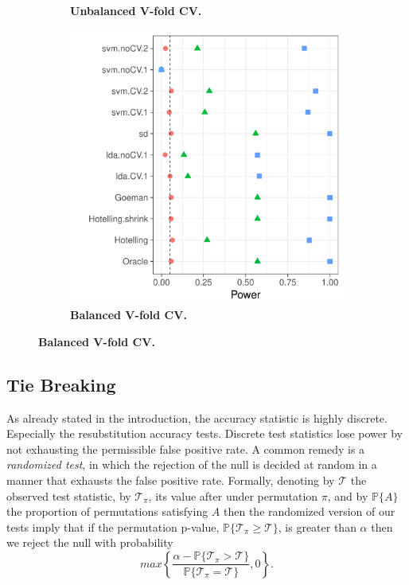 \documentclass[12pt,a4paper]{article}
\begin{document}
\begin{figure}[h]
\begin{subfigure}{.5\textwidth}
		\caption{\textbf{Unbalanced V-fold CV.}} 
		\label{fig:file3}
	\end{subfigure}%
	\begin{subfigure}{.5\textwidth}
		\centering
		\includegraphics[width=1\linewidth]{"art/file2"}
		\caption{\textbf{Balanced V-fold CV.}} 
		\label{fig:file2}
	\end{subfigure}
\end{figure}



\subsection{Tie Breaking}
\label{sec:ties}

As already stated in the introduction, the accuracy statistic is highly discrete. 
Especially the resubstitution accuracy tests. 
Discrete test statistics lose power by not exhausting the permissible false positive rate. 
A common remedy is a \emph{randomized test}, in which the rejection of the null is decided at random in a manner that exhausts the false positive rate. 
Formally, denoting by $\mathcal{T}$ the observed test statistic, by $\mathcal{T}_\pi$, its value after under permutation $\pi$, and by $\mathbb{P}\{A\}$ the proportion of permutations satisfying $A$ then the randomized version of our tests imply that if the permutation p-value, 
$\mathbb{P}\{\mathcal{T}_\pi \geq \mathcal{T}\}$, 
is greater than  $\alpha$ then we reject the null with probability 
$$ max\left\{\frac{\alpha - \mathbb{P}\{\mathcal{T}_\pi > \mathcal{T}\}}{\mathbb{P}\{\mathcal{T}_\pi = \mathcal{T}\}},0 \right\}.$$
\end{document}
